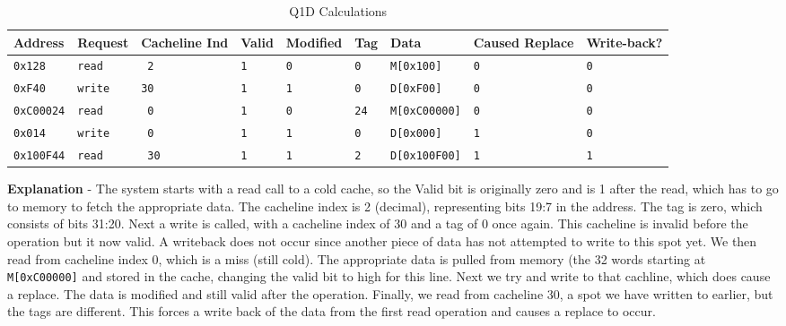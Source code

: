 \documentclass[a4paper,11pt]{article}
\newcommand{\T}{\texttt}
\begin{document}
\begin{table}[H]
\caption{Q1D Calculations} \label{tab:q1calc} 
\begin{center}
\begin{tabular}{| l | l | l | l | l | l | l | l | l |}
\hline
Address       & Request    & Cacheline Ind & Valid  & Modified  & Tag    & Data            & Caused Replace  & Write-back?    \\ \hline
\T{0x128}     &  \T{read}  & \T{ 2 }       & \T{1}  & \T{0}     & \T{0}  & \T{M[0x100]}    &      \T{0}      & \T{0}    \\ \hline
\T{0xF40}     &  \T{write} & \T{30 }       & \T{1}  & \T{1}     & \T{0}  & \T{D[0xF00]}    &      \T{0}      & \T{0}    \\ \hline
\T{0xC00024}  &  \T{read}  & \T{ 0 }       & \T{1}  & \T{0}     & \T{24} & \T{M[0xC00000]} &      \T{0}      & \T{0}    \\ \hline
\T{0x014}     &  \T{write} & \T{ 0 }       & \T{1}  & \T{1}     & \T{0}  & \T{D[0x000]}    &      \T{1}      & \T{0}    \\ \hline
\T{0x100F44}  &  \T{read}  & \T{ 30}       & \T{1}  & \T{1}     & \T{2}  & \T{D[0x100F00]} &      \T{1}      & \T{1}    \\ \hline
\end{tabular}
\end{center}
\end{table}

\textbf{Explanation} - The system starts with a read call to a cold cache, so the Valid bit is originally zero and is 1 after the read, which has to go to memory to fetch the appropriate data. The cacheline index is 2 (decimal), representing bits 19:7 in the address. The tag is zero, which consists of bits 31:20. Next a write is called, with a cacheline index of 30 and a tag of 0 once again. This cacheline is invalid before the operation but it now valid. A writeback does not occur since another piece of data has not attempted to write to this spot yet. We then read from cacheline index 0, which is a miss (still cold). The appropriate data is pulled from memory (the 32 words starting at \T{M[0xC00000]} and stored in the cache, changing the valid bit to high for this line. Next we try and write to that cachline, which does cause a replace. The data is modified and still valid after the operation. Finally, we read from cacheline 30, a spot we have written to earlier, but the tags are different. This forces a write back of the data from the first read operation and causes a replace to occur. \\
\end{document}
